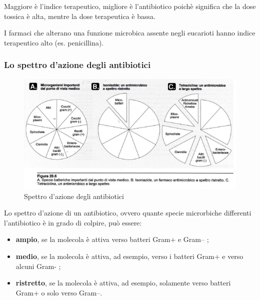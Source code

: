 \documentclass[11pt]{book}
\begin{document}
Maggiore è l’indice terapeutico, migliore è l’antibiotico poichè significa che la dose tossica è alta, mentre la dose terapeutica è bassa.

I farmaci che alterano una funzione microbica assente negli eucarioti hanno indice terapeutico alto (es. penicillina).

\clearpage
\subsubsection{Lo spettro d’azione degli antibiotici}

\begin{figure}[htp]
\centering
\includegraphics[scale=0.5]{img/Spettro d'azione.png}
\caption{Spettro d'azione degli antibiotici}
\label{}
\end{figure}

Lo spettro d'azione di un antibiotico, ovvero quante specie microrbiche differenti l'antibiotico è in grado di colpire, può essere:
\begin{itemize}
\item \textbf{ampio}, se la molecola è attiva verso batteri Gram+ e Gram– ;
\item \textbf{medio}, se la molecola è attiva, ad esempio, verso i batteri Gram+ e verso alcuni Gram- ;
\item \textbf{ristretto}, se la molecola è attiva, ad esempio, solamente verso batteri Gram+ o solo verso Gram–.
\end{itemize}
\end{document}
